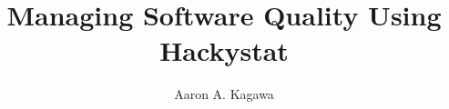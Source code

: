 \documentclass[11pt,proposal,times,thesis,actual]{uhthesis2e}
\begin{document}
\title{Managing Software Quality Using Hackystat}
\author{Aaron A. Kagawa}

\maketitle

\begin{frontmatter}

\end{frontmatter}





\end{document}
